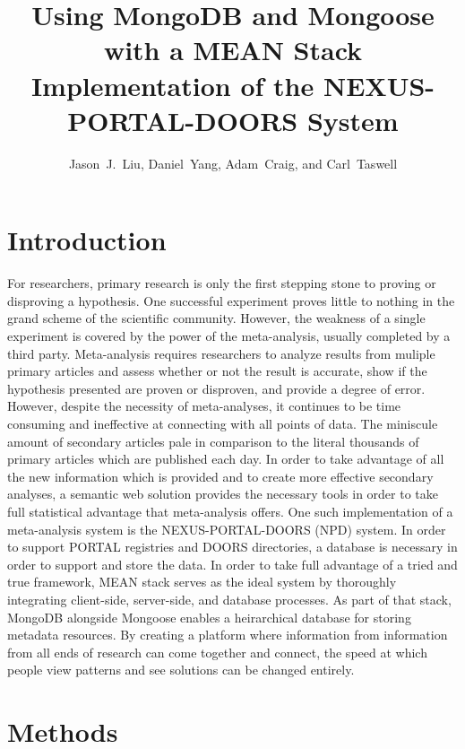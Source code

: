 \documentclass[10pt,twocolumn,twoside]{article}
\date{} %
\author{Jason~J.~Liu, Daniel~Yang, Adam~Craig, and Carl~Taswell}
\title{Using MongoDB and Mongoose with a MEAN Stack Implementation of the NEXUS-PORTAL-DOORS System\\ }
\begin{document}
\maketitle
\thispagestyle{empty}

\section*{Introduction}
\label{secIntroduction}
	For researchers, primary research is only the first stepping stone to proving or disproving a hypothesis. One successful experiment proves little to nothing in the grand scheme of the scientific community. However, the weakness of a single experiment is covered by the power of the meta-analysis, usually completed by a third party. Meta-analysis requires researchers to analyze results from muliple primary articles and assess whether or not the result is accurate, show if the hypothesis presented are proven or disproven, and provide a degree of error. However, despite the necessity of meta-analyses, it continues to be time consuming and ineffective at connecting with all points of data. The miniscule amount of secondary articles pale in comparison to the literal thousands of primary articles which are published each day. In order to take advantage of all the new information which is provided and to create more effective secondary analyses, a semantic web solution provides the necessary tools in order to take full statistical advantage that meta-analysis offers. 
 \newline
	One such implementation of a meta-analysis system is the NEXUS-PORTAL-DOORS (NPD) system. In order to support PORTAL registries and DOORS directories, a database is necessary in order to support and store the data. In order to take full advantage of a tried and true framework, MEAN stack serves as the ideal system by thoroughly integrating client-side, server-side, and database processes. As part of that stack, MongoDB alongside Mongoose enables a heirarchical database for storing metadata resources. By creating a platform where information from information from all ends of research can come together and connect, the speed at which people view patterns and see solutions can be changed entirely.

\section*{Methods}

\label{secMethods}
\end{document}
